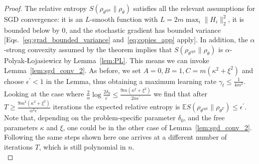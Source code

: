 \documentclass[
    reprint,
    aps,
    prx,
    longbibliography
]{revtex4-2}
\begin{document}
\begin{proof}
The relative entropy $S(\rho_{\theta^\mathrm{opt}} \| \rho_\theta)$ satisfies all the relevant assumptions for SGD convergence: it is an $L$-smooth function with $L=2 m \max_i \| H_i \|_2^2$, it is bounded below by $0$, and the stochastic gradient has bounded variance [Eqs.~\eqref{eq:grad_bounded_variance} and~\eqref{eq:copies_app} apply]. In addition, the $\alpha$-strong convexity assumed by the theorem implies that $S(\rho_{\theta^\mathrm{opt}} \| \rho_\theta)$ is $\alpha$-Polyak-{\L}ojasiewicz by Lemma~\ref{lem:PL}. This means we can invoke Lemma~\ref{lem:sgd_conv_2}. As before, we set $A=0, B=1, C=m( \kappa^2 + \xi^2)$ and choose $\epsilon^\prime < 1$ in the Lemma, thus obtaining a maximum learning rate $\gamma_t \leq \frac{1}{4m^2}$. Looking at the case where $\frac{2}{\alpha}\log{\frac{2\delta_0}{\epsilon^\prime}}\leq\frac{9m(\kappa^2 + \xi^2)}{2\alpha \epsilon^\prime}$ we find that after $T \geq \frac{9m^2(\kappa^2 + \xi^2)}{\alpha^2\epsilon^\prime}$ iterations the expected relative entropy is $\mathbb{E} S(\rho_{\theta^\mathrm{opt}} \|\rho_{\theta^T}) \leq \epsilon^\prime$. Note that, depending on the problem-specific parameter $\delta_0$, and the free parameters $\kappa$ and $\xi$, one could be in the other case of Lemma~\ref{lem:sgd_conv_2}. Following the same steps shown here one arrives at a different number of iterations $T$, which is still polynomial in $n$.\\


\end{proof}
\end{document}
